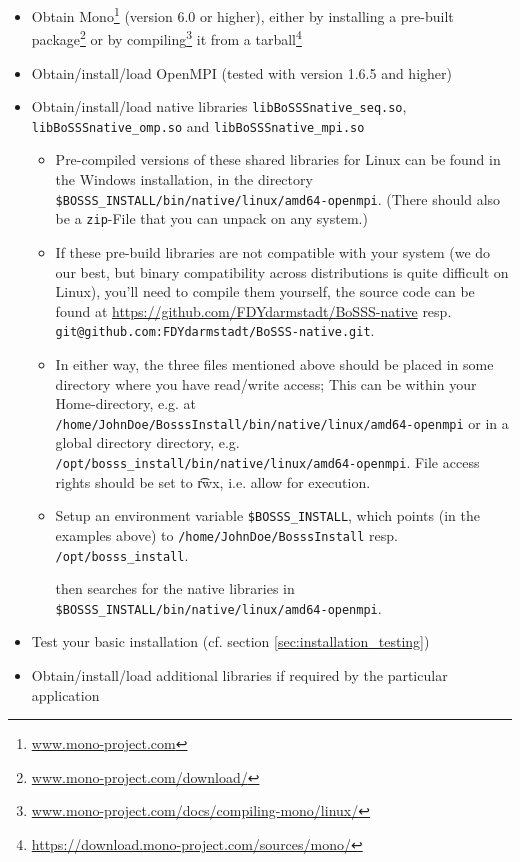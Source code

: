 \documentclass[a4paper,10pt]{report} %
\begin{document}
\begin{itemize}
\item 
Obtain Mono\footnote{\url{www.mono-project.com}} (version 6.0 or higher), 
either by installing a pre-built package\footnote{\url{www.mono-project.com/download/}} or 
by compiling\footnote{\url{www.mono-project.com/docs/compiling-mono/linux/}} it from a tarball\footnote{\url{https://download.mono-project.com/sources/mono/}}
\item 
Obtain/install/load OpenMPI (tested with version 1.6.5 and higher)

\item Obtain/install/load native libraries {\tt libBoSSSnative\_seq.so}, {\tt libBoSSSnative\_omp.so} and {\tt libBoSSSnative\_mpi.so}
\begin{itemize}
 \item 
 Pre-compiled versions of these shared libraries for Linux can be found in the Windows installation, in the directory {\tt \$BOSSS\_INSTALL/bin/native/linux/amd64-openmpi}.
 (There should also be a {\tt zip}-File that you can unpack on any system.)

 \item 
  If these pre-build libraries are not compatible with your system 
  (we do our best, but binary compatibility across distributions is quite difficult on Linux), you'll need to compile them yourself, 
  the source code can be found at {\url{https://github.com/FDYdarmstadt/BoSSS-native}} resp. {\tt git@github.com:FDYdarmstadt/BoSSS-native.git}.

 \item
 In either way, the three files mentioned above should be placed in some directory 
 where you have read/write access; This can be within your Home-directory, e.g. at 
 {\tt /home/JohnDoe/BosssInstall/bin/native/linux/amd64-openmpi} or 
 in a global directory directory, e.g. {\tt /opt/bosss\_install/bin/native/linux/amd64-openmpi}.
 File access rights should be set to {\t rwx}, i.e. allow for execution.

 \item
 Setup an environment variable {\tt \$BOSSS\_INSTALL}, which points (in the examples above) to 
 {\tt /home/JohnDoe/BosssInstall} resp. {\tt /opt/bosss\_install}.

 \BoSSS{} then searches for the native libraries in {\tt \$BOSSS\_INSTALL/bin/native/linux/amd64-openmpi}.
\end{itemize}

\item
Test your basic installation (cf. section \ref{sec:installation_testing})

\item
Obtain/install/load additional libraries if required by the particular \BoSSS{} application
\end{itemize}
\end{document}

